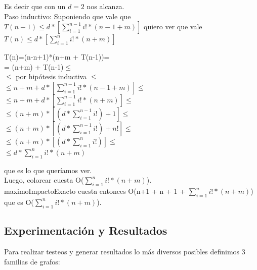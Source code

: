 \indent Es decir que con un $d=2$ nos alcanza.\\


\indent Paso inductivo: Suponiendo que vale que $T(n-1) \leq d * [\sum_{i=1}^{n-1} i! * (n-1+m)] $ quiero ver que vale $T(n) \leq d * [\sum_{i=1}^{n} i! * (n+m)] $ 

\begin{center}
T(n)=(n-n+1)*(n+m + T(n-1))=\\

= (n+m) + T(n-1)$\leq$\\

$\leq$ por hipótesis inductiva $\leq$\\

$\leq n+m + d * [\sum_{i=1}^{n-1} i! * (n-1+m)] \leq $\\

$\leq n+m + d * [\sum_{i=1}^{n-1} i! * (n+m)] \leq$ \\

$\leq (n+m) *[ (d* \sum_{i=1}^{n-1} i!) + 1] \leq$ \\

$\leq (n+m) *[ (d* \sum_{i=1}^{n-1} i!) + n!] \leq$ \\

$\leq (n+m) *[ (d* \sum_{i=1}^{n} i!)] \leq$\\

$\leq  d* \sum_{i=1}^{n} i!*(n+m)$\\

\end{center}

\indent que es lo que queríamos ver.\\

\indent Luego, colorear cuesta O($\sum_{i=1}^{n} i! * (n+m) $).\\

\indent maximoImpactoExacto cuesta entonces O(n+1 + n + 1 + $\sum_{i=1}^{n} i! * (n+m) $) que es O($\sum_{i=1}^{n} i! * (n+m) $).\\

\subsection{Experimentación y Resultados}

\quad Para realizar testeos y generar resultados lo más diversos posibles definimos 3 familias de grafos:

